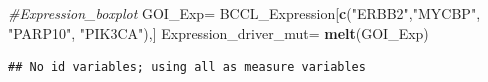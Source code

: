 \documentclass[]{article}
\newenvironment{Shaded}{\begin{snugshade}}{\end{snugshade}}
\newcommand{\CommentTok}[1]{\textcolor[rgb]{0.56,0.35,0.01}{\textit{#1}}}
\newcommand{\KeywordTok}[1]{\textcolor[rgb]{0.13,0.29,0.53}{\textbf{#1}}}
\newcommand{\NormalTok}[1]{#1}
\newcommand{\OperatorTok}[1]{\textcolor[rgb]{0.81,0.36,0.00}{\textbf{#1}}}
\newcommand{\StringTok}[1]{\textcolor[rgb]{0.31,0.60,0.02}{#1}}
\begin{document}
\begin{Shaded}
\begin{Highlighting}[]
\CommentTok{#Expression_boxplot}
\NormalTok{GOI_Exp=}\StringTok{ }\NormalTok{BCCL_Expression[}\KeywordTok{c}\NormalTok{(}\StringTok{"ERBB2"}\NormalTok{,}\StringTok{"MYCBP"}\NormalTok{, }\StringTok{"PARP10"}\NormalTok{, }\StringTok{"PIK3CA"}\NormalTok{),]}
\NormalTok{Expression_driver_mut=}\StringTok{ }\KeywordTok{melt}\NormalTok{(GOI_Exp)}
\end{Highlighting}
\end{Shaded}

\begin{verbatim}
## No id variables; using all as measure variables
\end{verbatim}

\begin{Shaded}
\end{Shaded}
\end{document}
